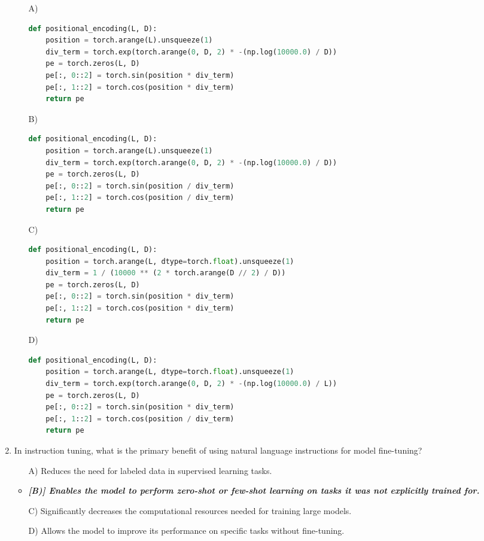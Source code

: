 \documentclass[10pt]{article}
\begin{document}
\begin{enumerate}
    \begin{itemize}
\item[A)] 
\begin{lstlisting}[language=Python]
def positional_encoding(L, D):
    position = torch.arange(L).unsqueeze(1)
    div_term = torch.exp(torch.arange(0, D, 2) * -(np.log(10000.0) / D))
    pe = torch.zeros(L, D)
    pe[:, 0::2] = torch.sin(position * div_term)
    pe[:, 1::2] = torch.cos(position * div_term)
    return pe
\end{lstlisting}

\item[B)] 
\begin{lstlisting}[language=Python]
def positional_encoding(L, D):
    position = torch.arange(L).unsqueeze(1)
    div_term = torch.exp(torch.arange(0, D, 2) * -(np.log(10000.0) / D))
    pe = torch.zeros(L, D)
    pe[:, 0::2] = torch.sin(position / div_term)
    pe[:, 1::2] = torch.cos(position / div_term)
    return pe
\end{lstlisting}



\item[C)] 
\begin{lstlisting}[language=Python]
def positional_encoding(L, D):
    position = torch.arange(L, dtype=torch.float).unsqueeze(1)
    div_term = 1 / (10000 ** (2 * torch.arange(D // 2) / D))
    pe = torch.zeros(L, D)
    pe[:, 0::2] = torch.sin(position * div_term)
    pe[:, 1::2] = torch.cos(position * div_term)
    return pe
\end{lstlisting}



\item[D)] 
\begin{lstlisting}[language=Python]
def positional_encoding(L, D):
    position = torch.arange(L, dtype=torch.float).unsqueeze(1)
    div_term = torch.exp(torch.arange(0, D, 2) * -(np.log(10000.0) / L))
    pe = torch.zeros(L, D)
    pe[:, 0::2] = torch.sin(position * div_term)
    pe[:, 1::2] = torch.cos(position / div_term)
    return pe
\end{lstlisting}
        
\end{itemize}



\item In instruction tuning, what is the primary benefit of using natural language instructions for model fine-tuning?
    \begin{itemize}
        \item[A)] Reduces the need for labeled data in supervised learning tasks.
        \item\textbf{\textit{[B)] Enables the model to perform zero-shot or few-shot learning on tasks it was not explicitly trained for.}}
        \item[C)] Significantly decreases the computational resources needed for training large models.
        \item[D)] Allows the model to improve its performance on specific tasks without fine-tuning.
    \end{itemize}



\end{enumerate}
\end{document}
